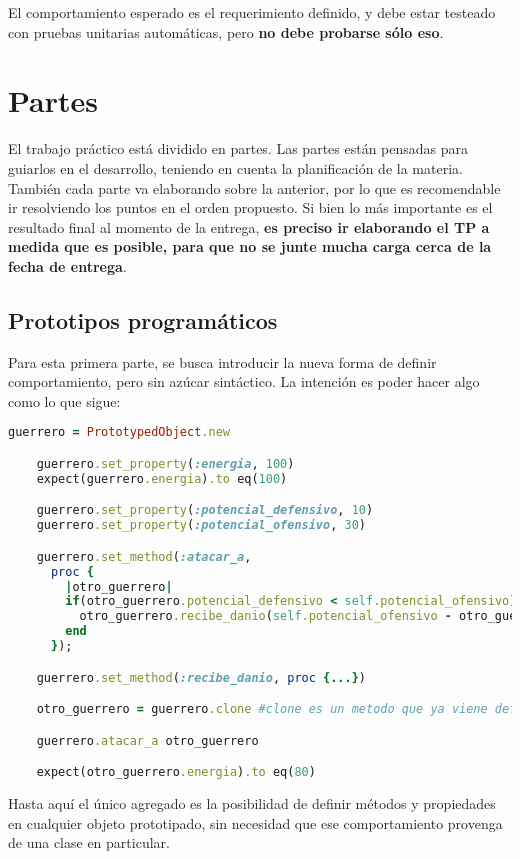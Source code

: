 \documentclass[spanish,a4paper]{article}
\begin{document}
El comportamiento esperado es el requerimiento definido, y debe estar testeado con pruebas unitarias automáticas, pero \textbf{no debe probarse sólo eso}.

\section{Partes}
El trabajo práctico está dividido en partes. Las partes están pensadas para guiarlos en el desarrollo, teniendo en cuenta la planificación de la materia. También cada parte va elaborando sobre la anterior, por lo que es recomendable ir resolviendo los puntos en el orden propuesto. Si bien lo más importante es el resultado final al momento de la entrega, \textbf{es preciso ir elaborando el TP a medida que es posible, para que no se junte mucha carga cerca de la fecha de entrega}.


\subsection{Prototipos programáticos}
Para esta primera parte, se busca introducir la nueva forma de definir comportamiento, pero sin azúcar sintáctico. La intención es poder hacer algo como lo que sigue:
\newpage 
 \begin{lstlisting}[language=Ruby]
	guerrero = PrototypedObject.new

	guerrero.set_property(:energia, 100)
	expect(guerrero.energia).to eq(100)

	guerrero.set_property(:potencial_defensivo, 10)
	guerrero.set_property(:potencial_ofensivo, 30)

	guerrero.set_method(:atacar_a, 
	  proc {
		|otro_guerrero|
		if(otro_guerrero.potencial_defensivo < self.potencial_ofensivo)
		  otro_guerrero.recibe_danio(self.potencial_ofensivo - otro_guerrero.potencial_defensivo)
		end
	  });

	guerrero.set_method(:recibe_danio, proc {...})

	otro_guerrero = guerrero.clone #clone es un metodo que ya viene definido en Ruby

	guerrero.atacar_a otro_guerrero

	expect(otro_guerrero.energia).to eq(80)	
  \end{lstlisting}
  
Hasta aquí el único agregado es la posibilidad de definir métodos y propiedades en cualquier objeto prototipado, sin necesidad que ese comportamiento provenga de una clase en particular.
\end{document}
